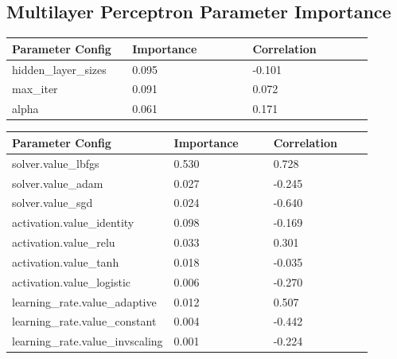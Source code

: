 \documentclass[11pt]{article}
\begin{document}
\subsection{Multilayer Perceptron Parameter Importance}
  \begin{table}[ht]
    \centering
    \begin{tabular}{|p{0.3\linewidth} | p{0.3\linewidth}| p{0.3\linewidth}|} 
      \hline
      \textbf{Parameter Config}  & \textbf{Importance} & \textbf{Correlation} \\ \hline
        hidden\_layer\_sizes & 0.095 & -0.101 \\ \hline
        max\_iter & 0.091 & 0.072 \\ \hline
        alpha & 0.061 & 0.171 \\ \hline
    \end{tabular}
  \end{table}\label{MLP_ParamImp1}

  
  \begin{table}[ht]
    \centering
    \begin{tabular}{|p{0.3\linewidth} | p{0.3\linewidth}| p{0.3\linewidth}|} 
      \hline
      \textbf{Parameter Config}  & \textbf{Importance} & \textbf{Correlation} \\ \hline
        solver.value\_lbfgs & 0.530 & 0.728 \\ \hline
        solver.value\_adam & 0.027 & -0.245 \\ \hline
        solver.value\_sgd & 0.024 & -0.640 \\ \hline
        activation.value\_identity & 0.098 & -0.169 \\ \hline
        activation.value\_relu & 0.033 & 0.301 \\ \hline
        activation.value\_tanh & 0.018 & -0.035 \\ \hline
        activation.value\_logistic & 0.006 & -0.270 \\ \hline
        learning\_rate.value\_adaptive & 0.012 & 0.507 \\ \hline
        learning\_rate.value\_constant & 0.004 & -0.442 \\ \hline
        learning\_rate.value\_invscaling & 0.001 & -0.224 \\ \hline
    \end{tabular}
  \end{table}\label{MLP_ParamImp2}
\end{document}

